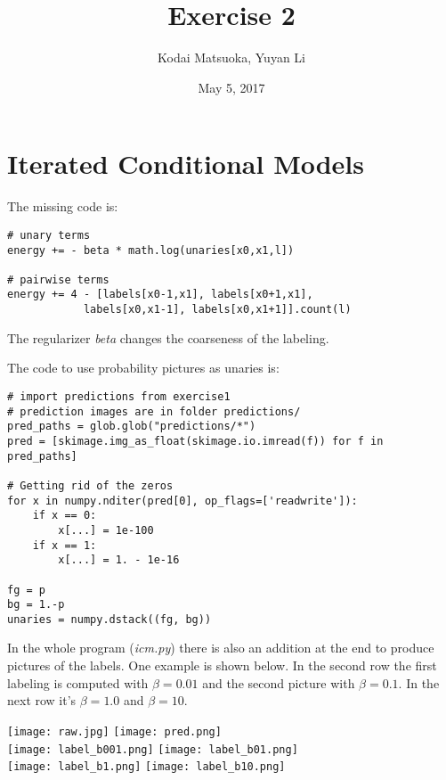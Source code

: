 \documentclass[12pt,a4paper]{scrartcl}
\author{Kodai Matsuoka, Yuyan Li}
\title{Exercise 2}
\date{May 5, 2017}
\begin{document}
\maketitle

\section{Iterated Conditional Models}

The missing code is:

\begin{verbatim}
# unary terms
energy += - beta * math.log(unaries[x0,x1,l])

# pairwise terms
energy += 4 - [labels[x0-1,x1], labels[x0+1,x1],
            labels[x0,x1-1], labels[x0,x1+1]].count(l)
\end{verbatim}

The regularizer \textit{beta} changes the coarseness of the labeling.

The code to use probability pictures as unaries is:

\begin{verbatim}
# import predictions from exercise1
# prediction images are in folder predictions/
pred_paths = glob.glob("predictions/*")
pred = [skimage.img_as_float(skimage.io.imread(f)) for f in pred_paths]

# Getting rid of the zeros
for x in numpy.nditer(pred[0], op_flags=['readwrite']):
    if x == 0:
        x[...] = 1e-100
    if x == 1:
        x[...] = 1. - 1e-16

fg = p
bg = 1.-p
unaries = numpy.dstack((fg, bg))
\end{verbatim}

In the whole program (\textit{icm.py}) there is also an addition at the end to produce pictures of the labels. One example is shown below. In the second row the first labeling is computed with $\beta=0.01$ and the second picture with $\beta=0.1$.
In the next row it's $\beta=1.0$ and $\beta=10$.

\texttt{[image: raw.jpg]}
\texttt{[image: pred.png]}
\\
\texttt{[image: label\_b001.png]}
\texttt{[image: label\_b01.png]}
\\
\texttt{[image: label\_b1.png]}
\texttt{[image: label\_b10.png]}
\\
% 
\end{document}
